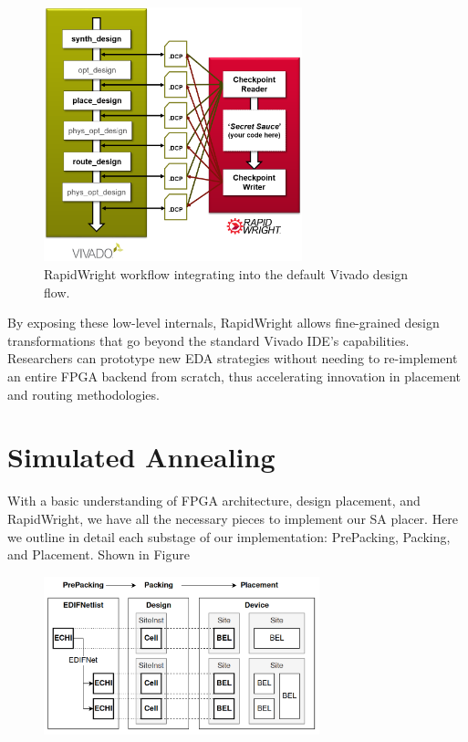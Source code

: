 \documentclass[twocolumn]{article}
\begin{document}
    \begin{figure}[]
        \centering
        \includegraphics[width=7.5cm]{figures/vivado_dcps.png}
        \caption{RapidWright workflow integrating into the default Vivado design flow.}
        \label{fig:vivado_dcps}
    \end{figure}

    By exposing these low-level internals, RapidWright allows fine-grained design transformations that go beyond the standard Vivado IDE’s capabilities. 
    Researchers can prototype new EDA strategies without needing to re-implement an entire FPGA backend from scratch, thus accelerating innovation in placement and routing methodologies.

\section{Simulated Annealing}
    \label{sec:simulated_annealing}
    With a basic understanding of FPGA architecture, design placement, and RapidWright, we have all the necessary pieces to implement our SA placer. 
    Here we outline in detail each substage of our implementation: PrePacking, Packing, and Placement. 
    Shown in Figure 

    \begin{figure}[]
        \centering
        \includegraphics[width=8.0cm]{figures/edif_design_device.png}
        \caption{}
    \end{figure}
\end{document}
